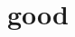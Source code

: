 \documentclass[letterpaper]{article} %
\begin{document}




\newpage
\appendix
\section{good}
\end{document}
